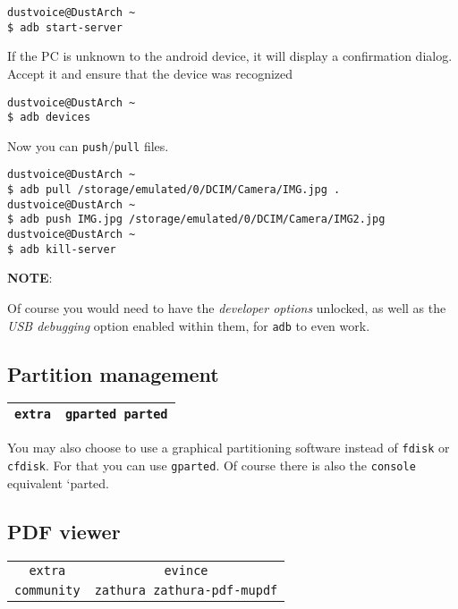 \documentclass[9pt]{report}
\newcommand{\admonition}[2]{\textbf{#1}: {#2}}
\begin{document}
\begin{verbatim}
dustvoice@DustArch ~
$ adb start-server
\end{verbatim}

If the PC is unknown to the android device, it will display a confirmation dialog.
Accept it and ensure that the device was recognized


\begin{verbatim}
dustvoice@DustArch ~
$ adb devices
\end{verbatim}

Now you can \texttt{push}/\texttt{pull} files.


\begin{verbatim}
dustvoice@DustArch ~
$ adb pull /storage/emulated/0/DCIM/Camera/IMG.jpg .
dustvoice@DustArch ~
$ adb push IMG.jpg /storage/emulated/0/DCIM/Camera/IMG2.jpg
dustvoice@DustArch ~
$ adb kill-server
\end{verbatim}

\admonition{NOTE}{Of course you would need to have the \emph{developer options} unlocked, as well as the \emph{USB debugging} option enabled within them, for \texttt{adb} to even work.

}

\vfill\eject

\hypertarget{x-partition-management}{\subsection{Partition management}}
\begin{center}
\begin{tabular}{|c|c|}
\hline
\texttt{extra} & \texttt{gparted parted} \\ 
\hline
\end{tabular}
\end{center}

You may also choose to use a graphical partitioning software instead of \texttt{fdisk} or \texttt{cfdisk}.
For that you can use \texttt{gparted}.
Of course there is also the \texttt{console} equivalent `parted.



\vfill\eject

\hypertarget{x-pdf-viewer}{\subsection{PDF viewer}}
\begin{center}
\begin{tabular}{|c|c|}
\hline
\texttt{extra} & \texttt{evince} \\ 
\texttt{community} & \texttt{zathura zathura-pdf-mupdf} \\ 
\hline
\end{tabular}
\end{center}
\end{document}
